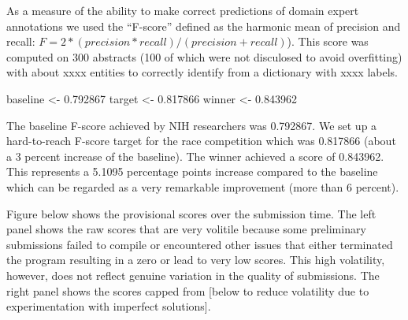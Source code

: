 \documentclass[]{article}
\newenvironment{Shaded}{\begin{snugshade}}{\end{snugshade}}
\newcommand{\FloatTok}[1]{\textcolor[rgb]{0.00,0.00,0.81}{#1}}
\newcommand{\StringTok}[1]{\textcolor[rgb]{0.31,0.60,0.02}{#1}}
\newcommand{\NormalTok}[1]{#1}
\let\oldShaded\Shaded
\let\endoldShaded\endShaded
\renewenvironment{Shaded}{\footnotesize\oldShaded}{\endoldShaded}
\begin{document}
As a measure of the ability to make correct predictions of domain expert
annotations we used the ``F-score'' defined as the harmonic mean of
precision and recall:
\(F = 2 * (precision * recall) / (precision + recall)\)). This score was
computed on 300 abstracts (100 of which were not disculosed to avoid
overfitting) with about xxxx entities to correctly identify from a
dictionary with xxxx labels.

\begin{Shaded}
\begin{Highlighting}[]
\NormalTok{baseline <-}\StringTok{ }\FloatTok{0.792867}
\NormalTok{target <-}\StringTok{ }\FloatTok{0.817866}
\NormalTok{winner <-}\StringTok{ }\FloatTok{0.843962}
\end{Highlighting}
\end{Shaded}

The baseline F-score achieved by NIH researchers was 0.792867. We set up
a hard-to-reach F-score target for the race competition which was
0.817866 (about a 3 percent increase of the baseline). The winner
achieved a score of 0.843962. This represents a 5.1095 percentage points
increase compared to the baseline which can be regarded as a very
remarkable improvement (more than 6 percent).

Figure below shows the provisional scores over the submission time. The
left panel shows the raw scores that are very volitile because some
preliminary submissions failed to compile or encountered other issues
that either terminated the program resulting in a zero or lead to very
low scores. This high volatility, however, does not reflect genuine
variation in the quality of submissions. The right panel shows the
scores capped from {[}below to reduce volatility due to experimentation
with imperfect solutions{]}.
\end{document}
